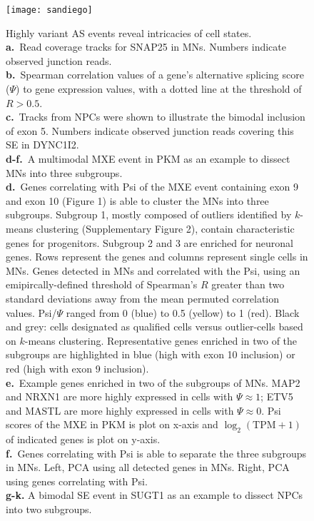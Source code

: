 \begin{figure}[h] 
  \centering
  \texttt{[image: sandiego]}
  \caption[Highly variant AS events reveal intricacies of cell states.]{
Highly variant AS events reveal intricacies of cell states.\\
\textbf{a.}~Read coverage tracks for SNAP25 in MNs. Numbers indicate observed junction reads.\\
\textbf{b.}~Spearman correlation values of a gene's alternative splicing score ($\Psi$) to gene expression values, with a dotted line at the threshold of $R > 0.5$.\\
\textbf{c.}~Tracks from NPCs were shown to illustrate the bimodal inclusion of exon 5. Numbers indicate observed junction reads covering this SE in DYNC1I2.\\
\textbf{d-f.}~A multimodal MXE event in PKM as an example to dissect MNs into three subgroups.\\
\textbf{d.}~Genes correlating with Psi of the MXE event containing exon 9 and exon 10 (Figure 1) is able to cluster the MNs into three subgroups. Subgroup 1, mostly composed of outliers identified by $k$-means clustering (Supplementary Figure 2), contain characteristic genes for progenitors. Subgroup 2 and 3 are enriched for neuronal genes. Rows represent the genes and columns represent single cells in MNs. Genes detected in MNs and correlated with the Psi, using an emipircally-defined threshold of Spearman's $R$ greater than two standard deviations away from the mean permuted correlation values. Psi/$\Psi$ ranged from 0 (blue) to 0.5 (yellow) to 1 (red). Black and grey: cells designated as qualified cells versus outlier-cells based on $k$-means clustering. Representative genes enriched in two of the subgroups are highlighted in blue (high with exon 10 inclusion) or red (high with exon 9 inclusion). \\
\textbf{e.}~Example genes enriched in two of the subgroups of MNs. MAP2 and NRXN1 are more highly expressed in cells with $\Psi \approx 1$; ETV5 and MASTL are more highly expressed in cells with $\Psi \approx 0$. Psi scores of the MXE in PKM is plot on x-axis and $\log_2(\mathrm{TPM}+1)$ of indicated genes is plot on y-axis.\\
\textbf{f.}~Genes correlating with Psi is able to separate the three subgroups in MNs. Left, PCA using all detected genes in MNs. Right, PCA using genes correlating with Psi.\\
\textbf{g-k.} A bimodal SE event in SUGT1 as an example to dissect NPCs into two subgroups.\\
}
\end{figure}
